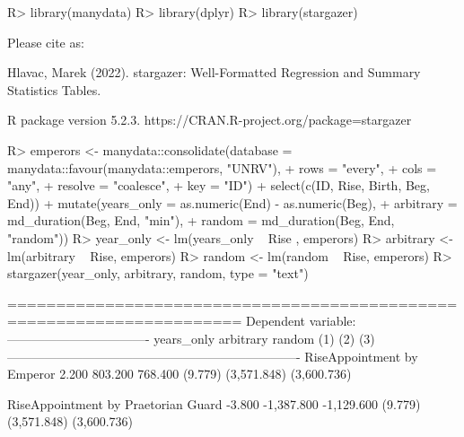 \documentclass[
]{jss}
\begin{document}
\begin{CodeChunk}
\begin{CodeInput}
R> library(manydata)
R> library(dplyr)
R> library(stargazer)
\end{CodeInput}
\begin{CodeOutput}

Please cite as: 
\end{CodeOutput}
\begin{CodeOutput}
 Hlavac, Marek (2022). stargazer: Well-Formatted Regression and Summary Statistics Tables.
\end{CodeOutput}
\begin{CodeOutput}
 R package version 5.2.3. https://CRAN.R-project.org/package=stargazer 
\end{CodeOutput}
\begin{CodeInput}
R> emperors <- manydata::consolidate(database = manydata::favour(manydata::emperors, "UNRV"),
+                                   rows = "every",
+                                   cols = "any",
+                                   resolve = "coalesce",
+                                   key = "ID") %
+   select(c(ID, Rise, Birth, Beg, End)) %
+   mutate(years_only = as.numeric(End) - as.numeric(Beg),
+          arbitrary = md_duration(Beg, End, "min"),
+          random = md_duration(Beg, End, "random"))
R> year_only <- lm(years_only ~ Rise , emperors)
R> arbitrary <- lm(arbitrary ~ Rise, emperors)
R> random <- lm(random ~ Rise, emperors)
R> stargazer(year_only, arbitrary, random, type = "text")
\end{CodeInput}
\begin{CodeOutput}

======================================================================
                                           Dependent variable:        
                                    ----------------------------------
                                    years_only  arbitrary    random   
                                       (1)         (2)         (3)    
----------------------------------------------------------------------
RiseAppointment by Emperor            2.200      803.200     768.400  
                                     (9.779)   (3,571.848) (3,600.736)
                                                                      
RiseAppointment by Praetorian Guard   -3.800   -1,387.800  -1,129.600 
                                     (9.779)   (3,571.848) (3,600.736)
                                                                      

\end{CodeOutput}
\end{CodeChunk}
\end{document}
